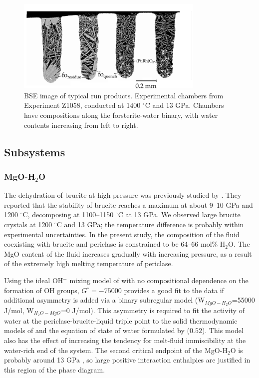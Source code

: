 \documentclass[review]{elsarticle}
\begin{document}
\begin{figure}[ht!]
  \centering
      \includegraphics[width=0.8\textwidth]{figures/Z1058_1400C_13GPa_fo}
  \caption{BSE image of typical run products. Experimental chambers from Experiment Z1058, conducted at 1400 $^{\circ}$C and 13 GPa. Chambers have compositions along the forsterite-water binary, with water contents increasing from left to right.}
  \label{fig:sem}
\end{figure}


\subsection{Subsystems}
\subsubsection{MgO-H$_2$O}
The dehydration of brucite at high pressure was previously studied by \cite{FIYKFO2005}. They reported that the stability of brucite reaches a maximum at about 9--10 GPa and 1200 $^{\circ}$C, decomposing at 1100--1150 $^{\circ}$C at 13 GPa. We observed large brucite crystals at 1200 $^{\circ}$C and 13 GPa; the temperature difference is probably within experimental uncertainties. In the present study, the composition of the fluid coexisting with brucite and periclase is constrained to be 64--66 mol\% H$_2$O. The MgO content of the fluid increases gradually with increasing pressure, as a result of the extremely high melting temperature of periclase. 

Using the ideal OH$^-$ mixing model of \cite{SS1985} with no compositional dependence on the formation of OH groups, $G^{\circ}= -75000$ provides a good fit to the data if additional asymmetry is added via a binary subregular model (W$_{MgO-H_2O}$=55000 J/mol, W$_{H_2O-MgO}$=0 J/mol). This asymmetry is required to fit the activity of water at the periclase-brucite-liquid triple point to the solid thermodynamic models of \citep{HP2011} and the equation of state of water formulated by \cite{PS1995} ($0.52$). This model also has the effect of increasing the tendency for melt-fluid immiscibility at the water-rich end of the system. The second critical endpoint of the MgO-H$_2$O is probably around 13 GPa \citep{MSUP2007}, so large positive interaction enthalpies are justified in this region of the phase diagram. 
\end{document}
